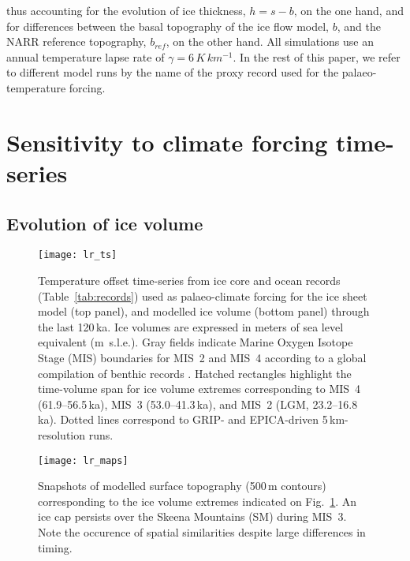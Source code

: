 \documentclass[tc, manuscript]{copernicus}
\begin{document}
thus accounting for the evolution of ice thickness, ${h=s-b}$,
on the one hand, and for differences between the basal topography of the ice
flow model, $b$, and the
NARR reference topography, $b_{ref}$, on the other hand. All simulations use an
annual temperature lapse rate of $\gamma = 6\,\unit{K\,km^{-1}}$.
In the rest of this paper, we refer to different model runs by the name of the
proxy record used for the palaeo-temperature forcing.

\section{Sensitivity to climate forcing time-series}
\label{sec:results}

\subsection{Evolution of ice volume}

\begin{figure*}
  \texttt{[image: lr\_ts]}
  \caption{Temperature offset time-series from ice core and ocean records
           (Table~\ref{tab:records}) used as palaeo-climate forcing for the ice
           sheet model (top panel), and modelled ice volume (bottom panel)
           through the last 120\,ka. Ice volumes are expressed in meters of sea
           level equivalent (m~s.l.e.). Gray fields indicate Marine Oxygen
           Isotope Stage (MIS) boundaries for MIS~2 and MIS~4 according to a
           global compilation of benthic  records
           \citep{Lisiecki.Raymo.2005}. Hatched rectangles highlight the
           time-volume span for ice volume extremes corresponding to MIS~4
           (61.9--56.5\,ka), MIS~3 (53.0--41.3\,ka), and MIS~2 (LGM,
           23.2--16.8\,ka). Dotted lines correspond to GRIP- and EPICA-driven
           5\,km-resolution runs.}
  \label{fig:lr_ts}
\end{figure*}

\begin{figure*}
  \texttt{[image: lr\_maps]}
  \caption{Snapshots of modelled surface topography (500\,m contours)
           corresponding to the ice volume extremes indicated on
           Fig.~\ref{fig:lr_ts}. An ice cap persists over the Skeena
           Mountains (SM) during MIS~3. Note the occurence of spatial
           similarities despite large differences in timing.}
  \label{fig:lr_maps}
\end{figure*}
\end{document}
